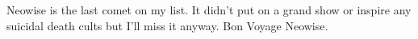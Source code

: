 Neowise is the last comet on my list. It didn't put on a grand show or
inspire any suicidal death cults but I'll miss it anyway. Bon Voyage
Neowise.

%
%



%
 
 
 
